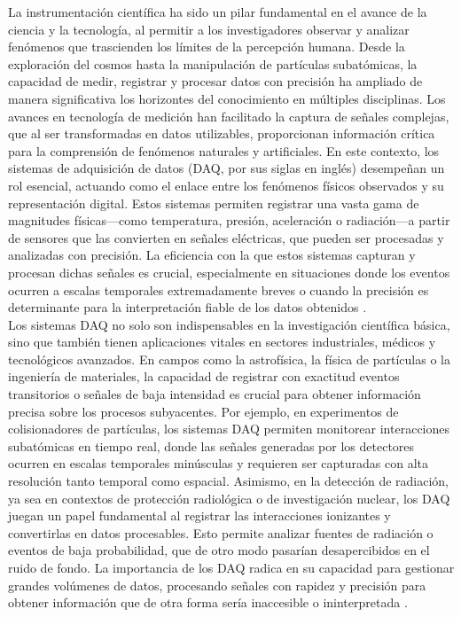 \documentclass{report}
\begin{document}
\noindent La instrumentación científica ha sido un pilar fundamental en el avance de la ciencia y la tecnología, al permitir a los investigadores observar y analizar fenómenos que trascienden los límites de la percepción humana. Desde la exploración del cosmos hasta la manipulación de partículas subatómicas, la capacidad de medir, registrar y procesar datos con precisión ha ampliado de manera significativa los horizontes del conocimiento en múltiples disciplinas. Los avances en tecnología de medición han facilitado la captura de señales complejas, que al ser transformadas en datos utilizables, proporcionan información crítica para la comprensión de fenómenos naturales y artificiales. En este contexto, los sistemas de adquisición de datos (DAQ, por sus siglas en inglés) desempeñan un rol esencial, actuando como el enlace entre los fenómenos físicos observados y su representación digital. Estos sistemas permiten registrar una vasta gama de magnitudes físicas—como temperatura, presión, aceleración o radiación—a partir de sensores que las convierten en señales eléctricas, que pueden ser procesadas y analizadas con precisión. La eficiencia con la que estos sistemas capturan y procesan dichas señales es crucial, especialmente en situaciones donde los eventos ocurren a escalas temporales extremadamente breves o cuando la precisión es determinante para la interpretación fiable de los datos obtenidos \cite{sinclair1}.\\

\noindent Los sistemas DAQ no solo son indispensables en la investigación científica básica, sino que también tienen aplicaciones vitales en sectores industriales, médicos y tecnológicos avanzados. En campos como la astrofísica, la física de partículas o la ingeniería de materiales, la capacidad de registrar con exactitud eventos transitorios o señales de baja intensidad es crucial para obtener información precisa sobre los procesos subyacentes. Por ejemplo, en experimentos de colisionadores de partículas, los sistemas DAQ permiten monitorear interacciones subatómicas en tiempo real, donde las señales generadas por los detectores ocurren en escalas temporales minúsculas y requieren ser capturadas con alta resolución tanto temporal como espacial. Asimismo, en la detección de radiación, ya sea en contextos de protección radiológica o de investigación nuclear, los DAQ juegan un papel fundamental al registrar las interacciones ionizantes y convertirlas en datos procesables. Esto permite analizar fuentes de radiación o eventos de baja probabilidad, que de otro modo pasarían desapercibidos en el ruido de fondo. La importancia de los DAQ radica en su capacidad para gestionar grandes volúmenes de datos, procesando señales con rapidez y precisión para obtener información que de otra forma sería inaccesible o ininterpretada \cite{gutleber2008data}.\\
\end{document}
